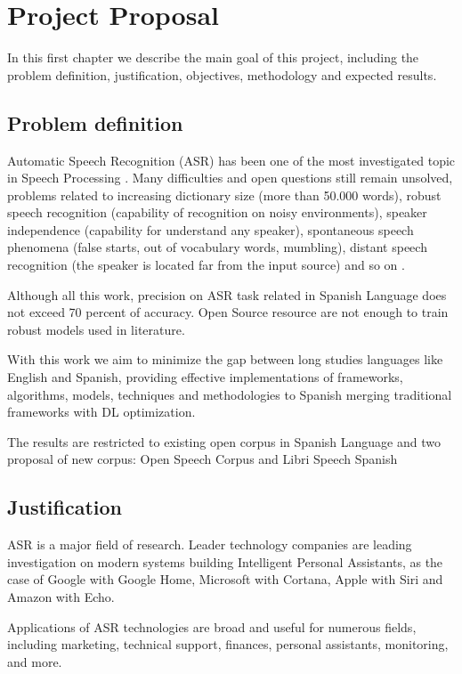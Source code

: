 \chapter{Project Proposal}

In this first chapter we describe the main goal of this project, including the problem definition, justification, objectives, methodology and expected results.
\section{Problem definition}

Automatic Speech Recognition (ASR) has been one of the most investigated topic in Speech Processing \cite{Rabiner1993FundamentalsRecognition}. Many difficulties and open questions still remain unsolved, problems related to increasing dictionary size (more than 50.000 words), robust speech recognition (capability of recognition on noisy environments), speaker independence (capability for understand any speaker), spontaneous speech phenomena (false starts, out of vocabulary words, mumbling), distant speech recognition (the speaker is located far from the input source) and so on \cite{Trentin2001ARecognition}.

Although all this work, precision on ASR task related in Spanish Language does not exceed 70 percent of accuracy. Open Source resource are not enough to train robust models used in literature.

With this work we aim to minimize the gap between long studies languages like English and Spanish, providing effective implementations of frameworks, algorithms, models, techniques and methodologies to Spanish merging traditional frameworks with DL optimization.

The results are restricted to existing open corpus in Spanish Language and two proposal of new corpus: Open Speech Corpus \cite{QUOTE REQUIRED} and Libri Speech Spanish \cite{QOUTE REQUIRED}

\section{Justification}

ASR is a major field of research. Leader technology companies are leading investigation on modern systems building Intelligent Personal Assistants, as the case of Google with Google Home\cite{Li2017}, Microsoft with Cortana\cite{Xiong2017}, Apple with Siri and Amazon with Echo.

Applications of ASR technologies are broad and useful for numerous fields, including marketing, technical support, finances, personal assistants, monitoring, and more.

